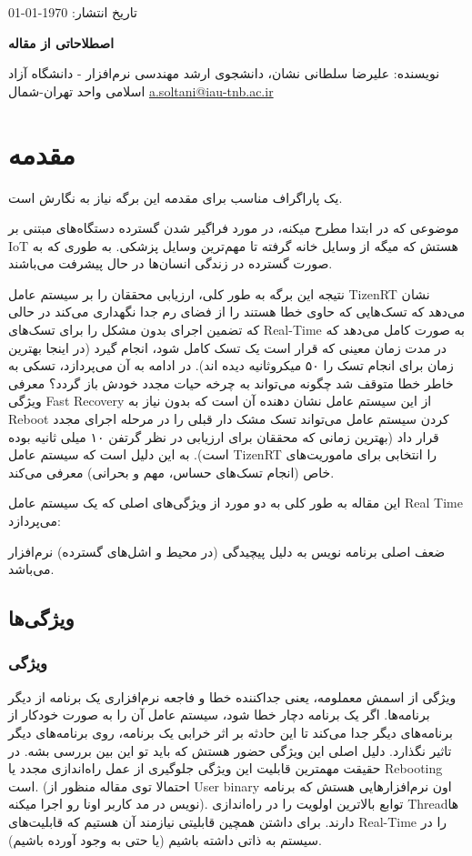 \documentclass[10pt, a4paper]{article}
\begin{document}
تاریخ انتشار: \today

\textbf{اصطلاحاتی از مقاله }

نویسنده: علیرضا سلطانی نشان، دانشجوی ارشد مهندسی نرم‌افزار - دانشگاه آزاد اسلامی
واحد تهران-شمال \href{mailto:a.soltani@iau-tnb.ac.ir}{a.soltani@iau-tnb.ac.ir}

\tableofcontents

\section{مقدمه}

یک پاراگراف مناسب برای مقدمه این برگه نیاز به نگارش است.

موضوعی که در ابتدا مطرح میکنه، در مورد فراگیر شدن گسترده دستگاه‌های مبتنی بر IoT
هستش که میگه از وسایل خانه گرفته تا مهم‌ترین وسایل پزشکی. به طوری که به صورت
گسترده در زندگی انسان‌ها در حال پیشرفت می‌باشند. 

نتیجه این برگه به طور کلی، ارزیابی محققان را بر سیستم عامل TizenRT نشان می‌دهد
که تسک‌هایی که حاوی خطا هستند را از فضای رم جدا نگهداری می‌کند در حالی که تضمین
اجرای بدون مشکل را برای تسک‌های Real-Time به صورت کامل می‌دهد که در مدت زمان
معینی که قرار است یک تسک کامل شود، انجام گیرد (در اینجا بهترین زمان برای انجام
تسک را ۵۰ میکروثانیه دیده اند). در ادامه به آن می‌پردازد، تسکی به خاطر خطا متوقف
شد چگونه می‌تواند به چرخه حیات مجدد خودش باز گردد؟ معرفی ویژگی Fast Recovery از
این سیستم عامل نشان دهنده آن است که بدون نیاز به Reboot کردن سیستم عامل می‌تواند
تسک مشک دار قبلی را در مرحله اجرای مجدد قرار داد (بهترین زمانی که محققان برای
ارزیابی در نظر گرتفن ۱۰ میلی ثانیه بوده است). به این دلیل است که سیستم عامل
TizenRT را انتخابی برای ماموریت‌های خاص (انجام تسک‌های حساس، مهم و بحرانی) معرفی
می‌کند.

این مقاله به طور کلی به دو مورد از ویژگی‌های اصلی که یک سیستم عامل Real Time
می‌پردازد:

ضعف اصلی برنامه نویس به دلیل پیچیدگی (در محیط و اشل‌های گسترده) نرم‌افزار می‌باشد.

\subsection{ویژگی‌ها}

\subsubsection{ویژگی }

ویژگی  از اسمش معملومه، یعنی جداکننده خطا و فاجعه نرم‌افزاری
یک برنامه از دیگر برنامه‌ها. اگر یک برنامه دچار خطا شود، سیستم‌ عامل آن را به
صورت خودکار از برنامه‌های دیگر جدا می‌کند تا این حادثه بر اثر خرابی یک برنامه،
روی برنامه‌های دیگر تاثیر نگذارد. دلیل اصلی این ویژگی حضور  هستش که باید تو این بین بررسی بشه. در حقیقت مهمترین قابلیت این ویژگی
جلوگیری از عمل راه‌اندازی مجدد یا Rebooting است. (احتمالا توی مقاله منظور از
User binary اون نرم‌افزارهایی هستش که برنامه نویس در مد کاربر اونا رو اجرا
میکنه). توابع  بالاترین اولویت را  در راه‌اندازی Thread‌ها
دارند.  برای داشتن همچین قابلیتی نیازمند آن هستیم که قابلیت‌های Real-Time را در
سیستم به ذاتی داشته باشیم (یا حتی به وجود آورده باشیم).
\end{document}
